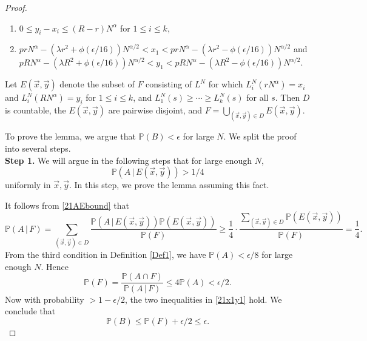\begin{proof}
\begin{enumerate}[label=(\arabic*)]
			\item $0\leq y_i - x_i \leq (R-r)N^\alpha$ for $1\leq i\leq k$,
			
			\item $prN^\alpha - (\lambda r^2+\phi(\epsilon/16))N^{\alpha/2} < x_1 <  prN^\alpha - (\lambda r^2-\phi(\epsilon/16))N^{\alpha/2}$ and $pRN^\alpha - (\lambda R^2+\phi(\epsilon/16))N^{\alpha/2} < y_1 <  pRN^\alpha - (\lambda R^2-\phi(\epsilon/16))N^{\alpha/2}$.
			
		\end{enumerate}
		Let $E(\vec{x},\vec{y})$ denote the subset of $F$ consisting of $L^N$ for which $L_i^N(rN^\alpha) = x_i$ and $L_i^N(RN^\alpha)=y_i$ for $1\leq i\leq k$, and $L_1^N(s) \geq \cdots \geq L_k^N(s)$ for all $s$. Then $D$ is countable, the $E(\vec{x},\vec{y})$ are pairwise disjoint, and $F = \bigcup_{(\vec{x},\vec{y})\in D} E(\vec{x},\vec{y})$.
		
		To prove the lemma, we argue that $\mathbb{P}(B) < \epsilon$ for large $N$. We split the proof into several steps.\\
		
		\noindent\textbf{Step 1.} We will argue in the following steps that for large enough $N$,
		\begin{equation}\label{21AEbound}
		\mathbb{P}(A\,|\, E(\vec{x},\vec{y})) > 1/4
		\end{equation}
		uniformly in $\vec{x},\vec{y}$. In this step, we prove the lemma assuming this fact. 
		
		It follows from \eqref{21AEbound} that
		\begin{equation}
		\mathbb{P}(A\,|\,F) = \sum_{(\vec{x},\vec{y})\in D} \frac{\mathbb{P}(A\,|\,E(\vec{x},\vec{y}))\mathbb{P}(E(\vec{x},\vec{y}))}{\mathbb{P}(F)} \geq \frac{1}{4}\cdot\frac{\sum_{(\vec{x},\vec{y})\in D} \mathbb{P}(E(\vec{x},\vec{y}))}{\mathbb{P}(F)} = \frac{1}{4}.
		\end{equation}
		From the third condition in Definition \ref{Def1}, we have $\mathbb{P}(A) < \epsilon/8$ for large enough $N$. Hence
		\[
		\mathbb{P}(F) = \frac{\mathbb{P}(A\cap F)}{\mathbb{P}(A\,|\,F)} \leq 4\mathbb{P}(A) < \epsilon/2.
		\]
		Now with probability $>1-\epsilon/2$, the two inequalities in \eqref{21x1y1} hold. We conclude that
		\[
		\mathbb{P}(B) \leq \mathbb{P}(F) + \epsilon/2 \leq \epsilon.
		\]
		

\end{proof}
